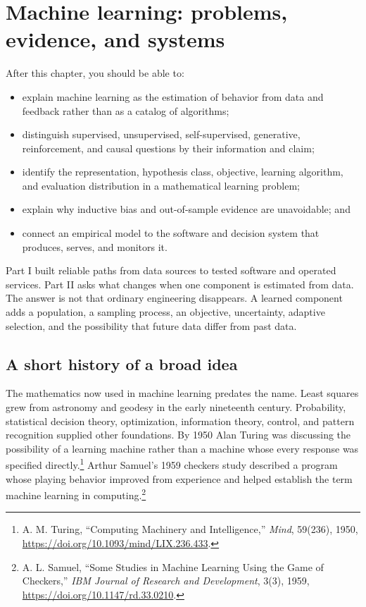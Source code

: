 \chapter{Machine learning: problems, evidence, and systems}
\label{ch:machine-learning-foundations}

\begin{learningobjectives}
After this chapter, you should be able to:
\begin{itemize}
  \item explain machine learning as the estimation of behavior from data and
  feedback rather than as a catalog of algorithms;
  \item distinguish supervised, unsupervised, self-supervised, generative,
  reinforcement, and causal questions by their information and claim;
  \item identify the representation, hypothesis class, objective, learning
  algorithm, and evaluation distribution in a mathematical learning problem;
  \item explain why inductive bias and out-of-sample evidence are unavoidable;
  and
  \item connect an empirical model to the software and decision system that
  produces, serves, and monitors it.
\end{itemize}
\end{learningobjectives}

\begin{chapterconnection}
Part I built reliable paths from data sources to tested software and operated
services. Part II asks what changes when one component is estimated from data.
The answer is not that ordinary engineering disappears. A learned component
adds a population, a sampling process, an objective, uncertainty, adaptive
selection, and the possibility that future data differ from past data.
\end{chapterconnection}

\section{A short history of a broad idea}

The mathematics now used in machine learning predates the name. Least squares
grew from astronomy and geodesy in the early nineteenth century. Probability,
statistical decision theory, optimization, information theory, control, and
pattern recognition supplied other foundations. By 1950 Alan Turing was
discussing the possibility of a learning machine rather than a machine whose
every response was specified directly.\footnote{A. M. Turing, ``Computing
Machinery and Intelligence,'' \emph{Mind}, 59(236), 1950,
\url{https://doi.org/10.1093/mind/LIX.236.433}.} Arthur Samuel's 1959 checkers
study described a program whose playing behavior improved from experience and
helped establish the term machine learning in computing.\footnote{A. L.
Samuel, ``Some Studies in Machine Learning Using the Game of Checkers,''
\emph{IBM Journal of Research and Development}, 3(3), 1959,
\url{https://doi.org/10.1147/rd.33.0210}.}

